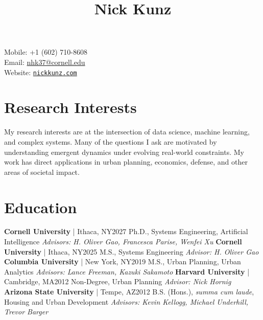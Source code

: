 \documentclass{article}
\title{
    \vspace{-48pt}
    \textbf{Nick Kunz}
    \vspace{-56pt}
}
\date{}
\begin{document}
\maketitle
\noindent
Mobile: \space\space +1 (602) 710-8608\\
Email: \space\space\space\url{nhk37@cornell.edu}\\
Website: \space\href{https://www.nickkunz.com}{\texttt{nickkunz.com}}

\section*{Research Interests}
My research interests are at the intersection of data science, machine learning, and complex systems. Many of the questions I ask are motivated by understanding emergent dynamics under evolving real-world constraints. My work has direct applications in urban planning, economics, defense, and other areas of societal impact.

\section*{Education}
    \textbf{Cornell University} | Ithaca, NY\hfill{2027}\newline
    Ph.D., Systems Engineering, Artificial Intelligence\newline
    \textit{Advisors: H. Oliver Gao, Francesca Parise, Wenfei Xu}\newline\newline
    \textbf{Cornell University} | Ithaca, NY\hfill{2025}\newline
    M.S., Systems Engineering\newline
    \textit{Advisor: H. Oliver Gao}\newline\newline
    \textbf{Columbia University} | New York, NY\hfill{2019}\newline
    M.S., Urban Planning, Urban Analytics\newline
    \textit{Advisors: Lance Freeman, Kazuki Sakamoto}\newline\newline
    \textbf{Harvard University} | Cambridge, MA\hfill{2012}\newline
    Non-Degree, Urban Planning\newline
    \textit{Advisor: Nick Hornig}\newline\newline
    \textbf{Arizona State University} | Tempe, AZ\hfill{2012}\newline
    B.S. (Hons.), \textit{summa cum laude}, Housing and Urban Development\newline
    \textit{Advisors: Kevin Kellogg, Michael Underhill, Trevor Barger}
\end{document}

